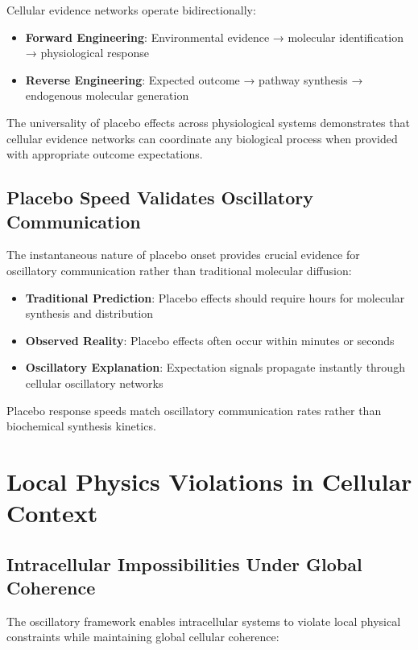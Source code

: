 \documentclass[12pt,a4paper]{article}
\begin{document}
{Cellular evidence networks operate bidirectionally:

\begin{itemize}
\item \textbf{Forward Engineering}: Environmental evidence → molecular identification → physiological response
\item \textbf{Reverse Engineering}: Expected outcome → pathway synthesis → endogenous molecular generation
\end{itemize}

The universality of placebo effects across physiological systems demonstrates that cellular evidence networks can coordinate any biological process when provided with appropriate outcome expectations.

\subsection{Placebo Speed Validates Oscillatory Communication}

The instantaneous nature of placebo onset provides crucial evidence for oscillatory communication rather than traditional molecular diffusion:

\begin{itemize}
\item \textbf{Traditional Prediction}: Placebo effects should require hours for molecular synthesis and distribution
\item \textbf{Observed Reality}: Placebo effects often occur within minutes or seconds
\item \textbf{Oscillatory Explanation}: Expectation signals propagate instantly through cellular oscillatory networks
\end{itemize}

Placebo response speeds match oscillatory communication rates rather than biochemical synthesis kinetics.

\section{Local Physics Violations in Cellular Context}

\subsection{Intracellular Impossibilities Under Global Coherence}

The oscillatory framework enables intracellular systems to violate local physical constraints while maintaining global cellular coherence:

}
\end{document}
